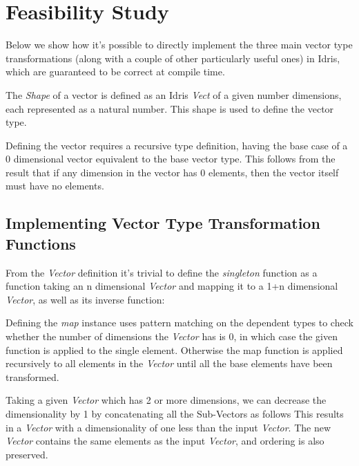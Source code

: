 \section{Feasibility Study}

Below we show how it's possible to directly implement the three main vector type transformations (along
with a couple of other particularly useful ones) in Idris, which are guaranteed to be correct at compile time.

The \textit{Shape} of a vector is defined as an Idris \textit{Vect} of a given number dimensions, each
represented as a natural number. This shape is used to define the vector type.

Defining the vector requires a recursive type definition, having the base case of a 0 dimensional vector 
equivalent to the base vector type. This follows from the result that if any dimension in the
vector has 0 elements, then the vector itself must have no elements.



\subsection{Implementing Vector Type Transformation Functions}

From the \textit{Vector} definition it's trivial to define the \textit{singleton} function
as a function taking an n dimensional \textit{Vector} and mapping it to a 1+n dimensional
\textit{Vector}, as well as its inverse function:



Defining the \textit{map} instance uses pattern matching on the dependent types
to check whether the number of dimensions the \textit{Vector} has is 0, in which case the 
given function is applied to the single element. Otherwise the map function is applied
recursively to all elements in the \textit{Vector} until all the base elements have been
transformed.



Taking a given \textit{Vector} which has 2 or more dimensions, we can decrease 
the dimensionality by 1 by concatenating all the Sub-Vectors as follows
This results in a \textit{Vector} with a dimensionality of one less than the input \textit{Vector}.
The new \textit{Vector} contains the same elements as the input \textit{Vector}, and ordering is
also preserved. 



